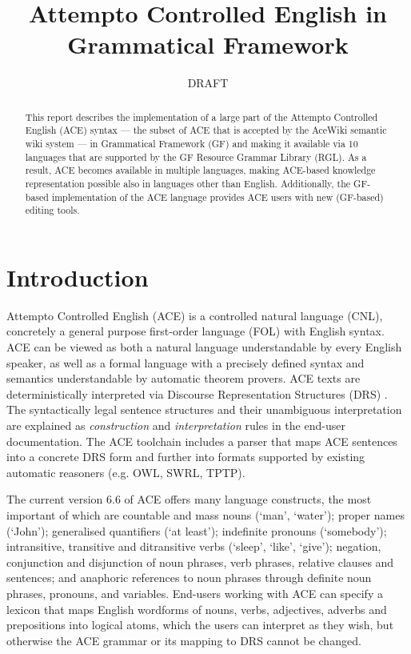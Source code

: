 \documentclass[a4paper]{article}
\newcommand\ace{Attempto Controlled English}
\begin{document}
\title{Attempto Controlled English in Grammatical Framework}
\author{DRAFT}




\begin{abstract}
This report describes the implementation of a large part of the
Attempto Controlled English (ACE) syntax ---
the subset of ACE that is accepted by the AceWiki semantic wiki system ---
in Grammatical Framework (GF) and making it available via 10
languages that are supported by the GF Resource Grammar Library (RGL).
As a result, ACE becomes available in multiple languages, making
ACE-based knowledge representation possible also in languages other than
English.
Additionally, the GF-based implementation of the ACE language provides
ACE users with new (GF-based) editing tools.
\end{abstract}

\clearpage
\thispagestyle{empty}
\tableofcontents

\clearpage
\setcounter{page}{1}
\section{Introduction}

\ace{} (ACE) \cite{fuchs:reasoningweb2008} is a controlled natural language
(CNL), concretely a general purpose
first-order language (FOL)
with English syntax.
ACE can be viewed as both a natural language understandable by every
English speaker, as well as a formal language with a precisely defined
syntax and semantics understandable by automatic theorem provers.
ACE texts are deterministically interpreted
via Discourse Representation Structures (DRS) \cite{kamp:drt1993}.
The syntactically legal sentence structures and their
unambiguous interpretation are explained as
\emph{construction} and \emph{interpretation} rules
in the end-user documentation.
The ACE toolchain includes a parser that maps ACE sentences into a concrete
DRS form \cite{ifi-2010.0010} and further into formats supported by existing
automatic reasoners (e.g. OWL, SWRL, TPTP).

The current version 6.6 of ACE offers many language constructs, the most
important of which are
countable and mass nouns (`man', `water');
proper names (`John');
generalised quantifiers (`at least');
indefinite pronouns (`somebody');
intransitive, transitive and ditransitive verbs (`sleep', `like', `give');
negation, conjunction and disjunction of
noun phrases, verb phrases, relative clauses and sentences;
and anaphoric references to noun phrases through
definite noun phrases, pronouns, and variables.
End-users working with ACE can specify a lexicon that maps English
wordforms of nouns, verbs, adjectives, adverbs and prepositions
into logical atoms,
which the users
can interpret as they wish, but otherwise the ACE grammar or its mapping to
DRS cannot be changed.
\end{document}
